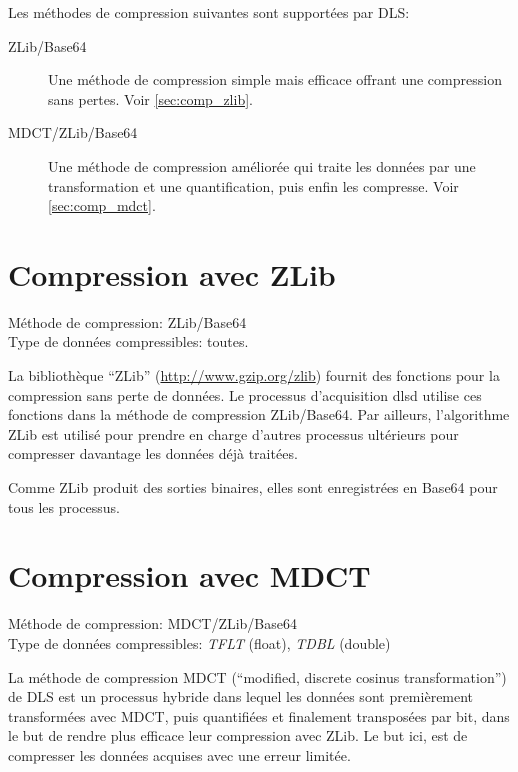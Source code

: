 \documentclass[a4paper,12pt,BCOR6mm,bibtotoc,idxtotoc]{scrbook}
\begin{document}
Les m\'ethodes de compression suivantes sont support\'ees par DLS:

\begin{description}

\item[ZLib/Base64] Une m\'ethode de compression simple mais efficace
  offrant une compression sans pertes. Voir \autoref{sec:comp_zlib}.

\item[MDCT/ZLib/Base64] Une m\'ethode de compression am\'elior\'ee qui
  traite les donn\'ees par une transformation et une quantification,
  puis enfin les compresse.  Voir \autoref{sec:comp_mdct}.

\end{description}



\section{Compression avec ZLib}
\label{sec:comp_zlib}

M\'ethode de compression: ZLib/Base64\\
Type de donn\'ees compressibles: toutes.

La biblioth\`eque ``ZLib'' (\url{http://www.gzip.org/zlib})
fournit des fonctions pour la compression sans perte de donn\'ees.
Le processus d'acquisition dlsd utilise ces fonctions dans la m\'ethode
de compression ZLib/Base64.
Par ailleurs, l'algorithme ZLib est utilis\'e pour prendre en charge
d'autres processus ult\'erieurs pour compresser davantage les donn\'ees d\'ej\`a
trait\'ees.

Comme ZLib produit des sorties binaires, elles sont enregistr\'ees en Base64 pour tous les processus.


\section{Compression avec MDCT}
\label{sec:comp_mdct} 

M\'ethode de compression: MDCT/ZLib/Base64\\
Type de donn\'ees compressibles: \textit{TFLT} (float), \textit{TDBL} (double)

La m\'ethode de compression MDCT (``modified, discrete cosinus
transformation'') de DLS est un processus hybride
dans lequel les donn\'ees sont premi\`erement transform\'ees avec MDCT,
puis quantifi\'ees et finalement transpos\'ees par bit, dans
le but de rendre plus efficace leur compression avec ZLib.
Le but ici, est de compresser les donn\'ees acquises avec une erreur
limit\'ee.
\end{document}
